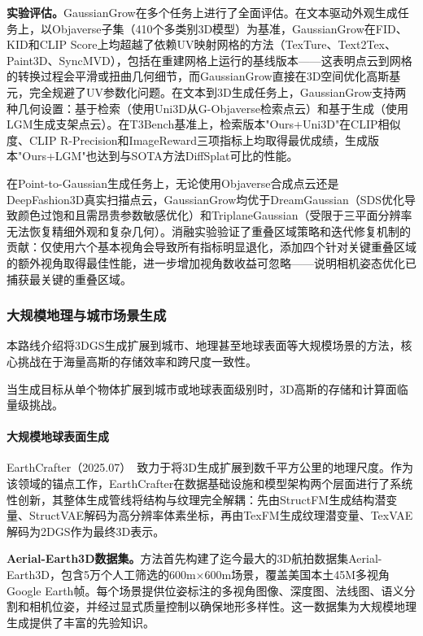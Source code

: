 \textbf{实验评估。}GaussianGrow在多个任务上进行了全面评估。在文本驱动外观生成任务上，以Objaverse子集（410个多类别3D模型）为基准，GaussianGrow在FID、KID和CLIP Score上均超越了依赖UV映射网格的方法（TexTure、Text2Tex、Paint3D、SyncMVD），包括在重建网格上运行的基线版本——这表明点云到网格的转换过程会平滑或扭曲几何细节，而GaussianGrow直接在3D空间优化高斯基元，完全规避了UV参数化问题。在文本到3D生成任务上，GaussianGrow支持两种几何设置：基于检索（使用Uni3D从G-Objaverse检索点云）和基于生成（使用LGM生成支架点云）。在T3Bench基准上，检索版本"Ours+Uni3D"在CLIP相似度、CLIP R-Precision和ImageReward三项指标上均取得最优成绩，生成版本"Ours+LGM"也达到与SOTA方法DiffSplat可比的性能。

在Point-to-Gaussian生成任务上，无论使用Objaverse合成点云还是DeepFashion3D真实扫描点云，GaussianGrow均优于DreamGaussian（SDS优化导致颜色过饱和且需昂贵参数敏感优化）和TriplaneGaussian（受限于三平面分辨率无法恢复精细外观和复杂几何）。消融实验验证了重叠区域策略和迭代修复机制的贡献：仅使用六个基本视角会导致所有指标明显退化，添加四个针对关键重叠区域的额外视角取得最佳性能，进一步增加视角数收益可忽略——说明相机姿态优化已捕获最关键的重叠区域。

\subsubsection{大规模地理与城市场景生成}

本路线介绍将3DGS生成扩展到城市、地理甚至地球表面等大规模场景的方法，核心挑战在于海量高斯的存储效率和跨尺度一致性。

当生成目标从单个物体扩展到城市或地球表面级别时，3D高斯的存储和计算面临量级挑战。

\paragraph{大规模地球表面生成}

EarthCrafter（2025.07）~\cite{2507_16535}致力于将3D生成扩展到数千平方公里的地理尺度。作为该领域的锚点工作，EarthCrafter在数据基础设施和模型架构两个层面进行了系统性创新，其整体生成管线将结构与纹理完全解耦：先由StructFM生成结构潜变量、StructVAE解码为高分辨率体素坐标，再由TexFM生成纹理潜变量、TexVAE解码为2DGS作为最终3D表示。

\textbf{Aerial-Earth3D数据集。}方法首先构建了迄今最大的3D航拍数据集Aerial-Earth3D，包含5万个人工筛选的600m$\times$600m场景，覆盖美国本土45M多视角Google Earth帧。每个场景提供位姿标注的多视角图像、深度图、法线图、语义分割和相机位姿，并经过显式质量控制以确保地形多样性。这一数据集为大规模地理生成提供了丰富的先验知识。

